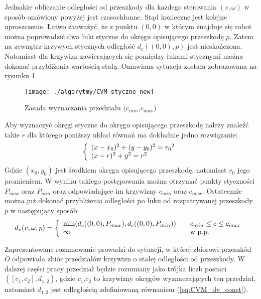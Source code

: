 	Jednakże obliczanie odległości od przeszkody dla każdego sterowania $(v,\omega)$ w sposób omówiony powyżej
	jest czasochłonne. Stąd konieczne jest kolejne uproszczenie. Łatwo zauważyć, że z punktu $(0,0)$ w którym
	znajduje się robot można poprowadzić dwa łuki styczne do okręgu opisującego przeszkodę $p$. Zatem na zewnątrz
	krzywych stycznych odległość  $d_c((0,0),p)$ jest nieskończona. Natomiast dla krzywizn zawierających się
	pomiędzy łukami stycznymi można dokonać przybliżenia wartością stałą. Omawiana sytuacja została zobrazowana na
	rysunku \ref{fig:CVM_styczne}.
	\begin{figure}[!b]
	\centering
	\texttt{[image: ./algorytmy/CVM\_styczne\_new]}
	\caption{ Zasada wyznaczania przedziału $(c_{min}$,$c_{max})$ \label{fig:CVM_styczne}}
	\end{figure}
	Aby wyznaczyć okręgi styczne do okręgu opisującego przeszkodę należy znaleźć takie $r$ dla którego
	poniższy układ równań ma dokładnie jedno rozwiązanie:
	\begin{equation}\label{eq:CVM_styczne}
	 \left\{ 
	\begin{array}{l l}
  	(x-x_0)^2 + (y-y_0)^2={r_0}^2\\
  	 (x-r)^2 + y^2={r}^2\\
	\end{array} \right. 
	\end{equation}
	Gdzie $(x_0,y_0)$ jest środkiem okręgu opisującego przeszkodę, natomiast $r_0$ jego promieniem.
	W wyniku takiego postępowania można otrzymać punkty styczności $P_{max}$ oraz $P_{min}$ oraz odpowiadające im krzywizny $c_{min}$ oraz $c_{max}$. 
	Ostatecznie można już dokonać przybliżenia odległości po łuku od rozpatrywanej przeszkody $p$ w następujący sposób:
	\begin{equation}\label{eq:CVM_dv_const}
	d_v(v,\omega,p)= \left\{ 
	\begin{array}{l l}
  	\min(d_c((0,0),P_{max}),d_c((0,0),P_{min})) & \quad \mbox{$c_{min}\leq c \leq c_{max}$  }\\
  	\infty & \quad \mbox{w p.p. }\\
	\end{array} \right. 
	\end{equation}

	Zaprezentowane rozumowanie prowadzi do sytuacji, w której zbiorowi przeszkód $O$ odpowiada zbiór przedziałów krzywizn o stałej odległości od przeszkody. W dalszej części pracy przedział będzie rozumiany jako trójka liczb postaci $([c_1,c_2],d_{1,2})$, gdzie $c_1$,$c_2$ to krzywizny okręgów wyznaczających ten przedział, natomiast $d_{1,2}$ jest odległością zdefiniowaną równaniem (\ref{eq:CVM_dv_const}).
	
